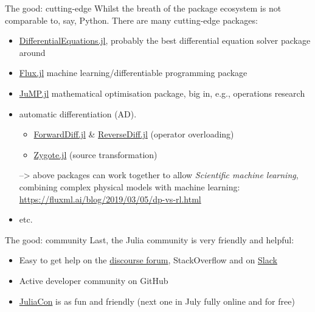 \documentclass[compress,presentation,aspectratio=169]{beamer}
\begin{document}
\begin{frame}[label={sec:org2946c39}]{The good: cutting-edge}
  \footnotesize
Whilst the breath of the package ecosystem is not comparable to, say,
Python.  There are many \alert{cutting-edge} packages:

\begin{itemize}
\item \href{https://github.com/JuliaDiffEq/DifferentialEquations.jl}{DifferentialEquations.jl}, probably the best differential equation
solver package around
\item \href{https://fluxml.ai/2019/02/07/what-is-differentiable-programming.html}{Flux.jl} machine learning/differentiable programming package
\item \href{https://github.com/JuliaOpt/JuMP.jl}{JuMP.jl} mathematical optimisation package, big in, e.g., operations
research
\item automatic differentiation (AD).
\begin{itemize}
\item \href{https://github.com/JuliaDiff/ForwardDiff.jl}{ForwardDiff.jl} \& \href{https://github.com/JuliaDiff/ReverseDiff.jl}{ReverseDiff.jl} (operator overloading)
\item \href{https://github.com/FluxML/Zygote.jl}{Zygote.jl} (source transformation)
\end{itemize}

--> above packages can work together to allow \emph{Scientific machine
    learning}, combining complex physical models with machine learning:
    \url{https://fluxml.ai/blog/2019/03/05/dp-vs-rl.html}

\item etc.
\end{itemize}
\end{frame}

\begin{frame}[label={sec:orgebef73a}]{The good: community}
  \footnotesize
Last, the Julia community is very friendly and helpful:

\begin{itemize}
\item Easy to get help on the \href{https://discourse.julialang.org}{discourse forum}, StackOverflow and on \href{https://julialang.slack.com/}{Slack}
\item Active developer community on GitHub
\item \href{https://juliacon.org}{JuliaCon} is as fun and friendly (next one in July fully online and for free)
\end{itemize}

\end{frame}
\end{document}

